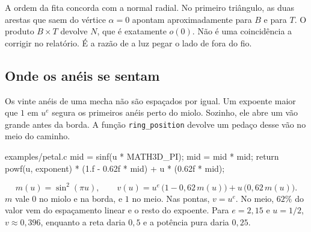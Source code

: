 \documentclass[11pt,a4paper]{article}
\newcommand{\fn}[1]{\texttt{\nobreak\hspace{0pt}#1}}
\begin{document}
A ordem da fita concorda com a normal radial. No primeiro triângulo, as duas arestas que saem do vértice \(\alpha = 0\) apontam aproximadamente para \(B\) e para \(T\). O produto \(B \times T\) devolve \(N\), que é exatamente \(o(0)\). Não é uma coincidência a corrigir no relatório. É a razão de a luz pegar o lado de fora do fio.

\subsection{Onde os anéis se sentam}

Os vinte anéis de uma mecha não são espaçados por igual. Um expoente maior que \(1\) em \(u^{e}\) segura os primeiros anéis perto do miolo. Sozinho, ele abre um vão grande antes da borda. A função \fn{ring\_position} devolve um pedaço desse vão no meio do caminho.

\begin{codigo}{examples/petal.c}
mid = sinf(u * MATH3D_PI);
mid = mid * mid;
return powf(u, exponent) * (1.f - 0.62f * mid) + u * (0.62f * mid);
\end{codigo}

\begin{equation}
  m(u) = \sin^{2}(\pi u),
  \qquad
  v(u) = u^{e}\,\big(1 - 0{,}62\, m(u)\big) + u\,\big(0{,}62\, m(u)\big).
  \label{eq:v}
\end{equation}
\(m\) vale \(0\) no miolo e na borda, e \(1\) no meio. Nas pontas, \(v = u^{e}\). No meio, \(62\%\) do valor vem do espaçamento linear e o resto do expoente. Para \(e = 2{,}15\) e \(u = 1/2\), \(v \approx 0{,}396\), enquanto a reta daria \(0{,}5\) e a potência pura daria \(0{,}25\).
\end{document}
